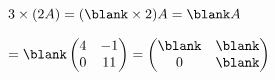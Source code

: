 $3\times(2A)=(\blank\times 2)A=\blank A$\par\noindent\phantom{$3\times(2A)$}$=\blank\begin{pmatrix} 4 & -1 \\ 0 & 11 \end{pmatrix}=\begin{pmatrix} \blank & \blank \\ 0 & \blank \end{pmatrix}$
